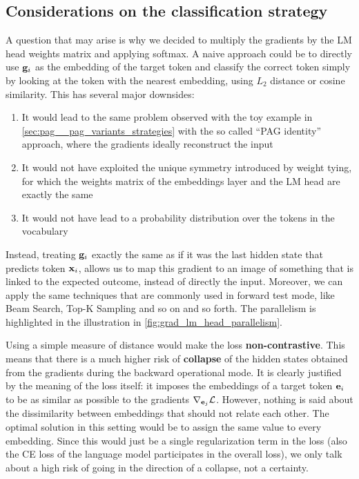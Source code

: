 \documentclass[../thesis.tex]{subfiles}
\begin{document}
\subsection{Considerations on the classification strategy}
A question that may arise is why we decided to multiply the gradients by the LM head weights matrix and applying softmax.
A naive approach could be to directly use $\mathbf{g}_i$ as the embedding of the target token and classify the correct token simply by looking at the token with the nearest embedding, using $L_2$ distance or cosine similarity.
This has several major downsides:
\begin{enumerate}
    \item It would lead to the same problem observed with the toy example in \cref{sec:pag__pag_variants_strategies} with the so called ``PAG identity'' approach, where the gradients ideally reconstruct the input
    \item It would not have exploited the unique symmetry introduced by weight tying, for which the weights matrix of the embeddings layer and the LM head are exactly the same
    \item It would not have lead to a probability distribution over the tokens in the vocabulary
\end{enumerate}

Instead, treating $\mathbf{g}_i$ exactly the same as if it was the last hidden state that predicts token $\mathbf{x}_i$, allows us to map this gradient to an image of something that is linked to the expected outcome, instead of directly the input.
Moreover, we can apply the same techniques that are commonly used in forward test mode, like Beam Search, Top-K Sampling and so on and so forth.
The parallelism is highlighted in the illustration in \cref{fig:grad_lm_head_parallelism}.

Using a simple measure of distance would make the loss \textbf{non-contrastive}.
This means that there is a much higher risk of \textbf{collapse} of the hidden states obtained from the gradients during the backward operational mode.
It is clearly justified by the meaning of the loss itself: it imposes the embeddings of a target token $\mathbf{e}_i$ to be as similar as possible to the gradients $\nabla_{\mathbf{e}_j} \mathcal{L}$. However, nothing is said about the dissimilarity between embeddings that should not relate each other. The optimal solution in this setting would be to assign the same value to every embedding.
Since this would just be a single regularization term in the loss (also the CE loss of the language model participates in the overall loss), we only talk about a high risk of going in the direction of a collapse, not a certainty.
\end{document}
